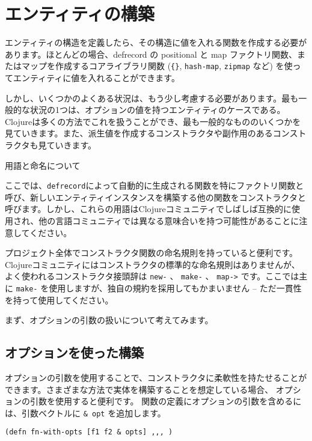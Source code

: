 \section{エンティティの構築}


エンティティの構造を定義したら、その構造に値を入れる関数を作成する必要があります。ほとんどの場合、defrecord の positional と map ファクトリ関数、またはマップを作成するコアライブラリ関数 (\texttt{\{\}}, \texttt{hash-map}, \texttt{zipmap} など) を使ってエンティティに値を入れることができます。

しかし、いくつかのよくある状況は、もう少し考慮する必要があります。最も一般的な状況の1つは、オプションの値を持つエンティティのケースである。Clojureは多くの方法でこれを扱うことができ、最も一般的なもののいくつかを見ていきます。また、派生値を作成するコンストラクタや副作用のあるコンストラクタも見ていきます。

\begin{itembox}[l]{用語と命名について}

ここでは、\texttt{defrecord}によって自動的に生成される関数を特にファクトリ関数と呼び、新しいエンティティインスタンスを構築する他の関数をコンストラクタと呼びます。しかし、これらの用語はClojureコミュニティでしばしば互換的に使用され、他の言語コミュニティでは異なる意味合いを持つ可能性があることに注意してください。

プロジェクト全体でコンストラクタ関数の命名規則を持っていると便利です。Clojureコミュニティにはコンストラクタの標準的な命名規則はありませんが、よく使われるコンストラクタ接頭辞は \texttt{new-} 、 \texttt{make-} 、 \texttt{map->} です。ここでは主に \texttt{make-} を使用しますが、独自の規約を採用してもかまいません -- ただ一貫性を持って使用してください。
\end{itembox}

まず、オプションの引数の扱いについて考えてみます。

\subsection{オプションを使った構築}

オプションの引数を使用することで、コンストラクタに柔軟性を持たせることができます。さまざまな方法で実体を構築することを想定している場合、 オプションの引数を使用すると便利です。
関数の定義にオプションの引数を含めるには、引数ベクトルに \texttt{\& opt} を追加します。


\begin{lstlisting}[numbers=none]
(defn fn-with-opts [f1 f2 & opts] ,,, )
\end{lstlisting}

